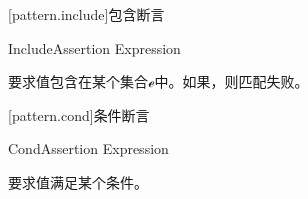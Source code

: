 [pattern.include]{包含断言}

\begin{bnf}{IncludeAssertion}
     Expression
\end{bnf}

\pnum
{}要求值包含在某个集合$\mathcal{e}$中。如果，则匹配失败。

[pattern.cond]{条件断言}

\begin{bnf}{CondAssertion}
     Expression
\end{bnf}

\pnum
{}要求值满足某个条件。